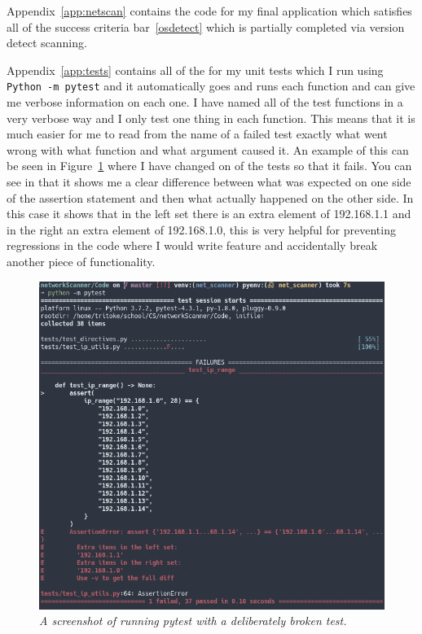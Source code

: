 \documentclass[titlepage]{article}
\begin{document}
Appendix~\ref{app:netscan} contains the code for my final application which satisfies all of the success
criteria bar~\ref{osdetect} which is partially completed via version detect scanning.

Appendix~\ref{app:tests} contains all of the for my unit tests which I run using \\
\verb|Python -m pytest| and it automatically goes and runs each function and can give me verbose information on each one.
I have named all of the test functions in a very verbose way and I only test one thing in each function.
This means that it is much easier for me to read from the name of a failed test exactly what went wrong
with what function and what argument caused it. An example of this can be seen in Figure~\ref{testing}
where I have changed on of the tests so that it fails. You can see in that it shows me a clear difference
between what was expected on one side of the assertion statement and then what actually happened on the
other side. In this case it shows that in the left set there is an extra element of 192.168.1.1 and in
the right an extra element of 192.168.1.0, this is very helpful for preventing regressions in the code
where I would write feature and accidentally break another piece of functionality.

\begin{figure}[H]
  \centering
  \includegraphics[width=\textwidth]{testing.png}
  \caption{\textit{%
    A screenshot of running pytest with a deliberately broken test.
}}\label{testing}
\end{figure}
\end{document}
